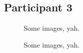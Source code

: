 \lipsum[1]


\clearpage

\subsection{Participant 3}

\begin{figure}[h]
	\caption{Some images, yah.}
\end{figure}

\lipsum[1]

\clearpage

\begin{figure}[h]
	\caption{Some images, yah.}
\end{figure}

